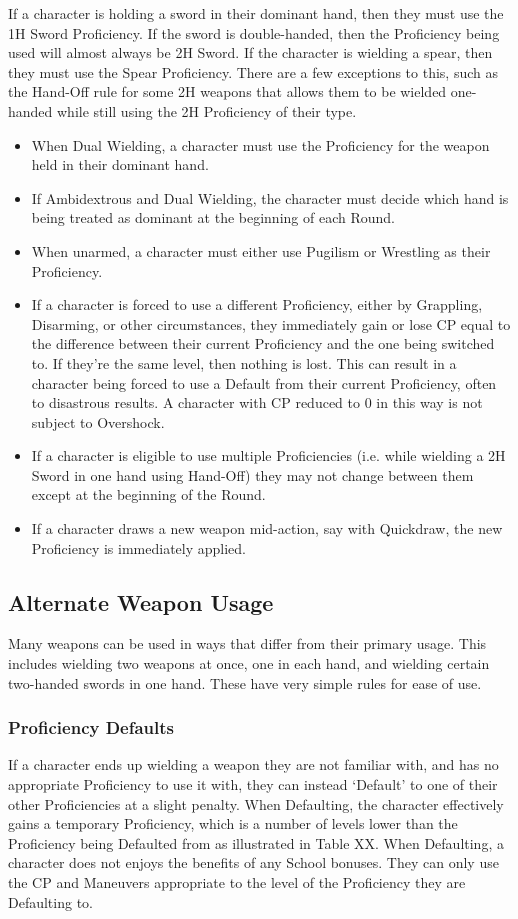\documentclass[oneside,11pt,english]{book}
\begin{document}
If a character is holding a sword in their dominant hand, then they must use the 1H Sword Proficiency. If 
the sword is double-handed, then the Proficiency being used will almost always be 2H Sword. If the 
character is wielding a spear, then they must use the Spear Proficiency. There are a few exceptions to this, 
such as the Hand-Off rule for some 2H weapons that allows them to be wielded one-handed while still 
using the 2H Proficiency of their type. 
\begin{itemize}
	\item When Dual Wielding, a character must use the Proficiency for the weapon held in their dominant hand. 
	\item If Ambidextrous and Dual Wielding, the character must decide which hand is being treated as dominant at the beginning of each Round.
	\item When unarmed, a character must either use Pugilism or Wrestling as their Proficiency. 
	\item If a character is forced to use a different Proficiency, either by Grappling, Disarming, or other circumstances, they immediately gain or lose CP equal to the difference between their current Proficiency and the one being switched to. If they’re the same level, then nothing is lost. This can result in a character being forced to use a Default from their current Proficiency, often to disastrous results. A character with CP reduced to 0 in this way is not subject to Overshock.
	\item If a character is eligible to use multiple Proficiencies (i.e. while wielding a 2H Sword in one hand using Hand-Off) they may not change between them except at the beginning of the Round.
	\item If a character draws a new weapon mid-action, say with Quickdraw, the new Proficiency is immediately applied.
\end{itemize}

\subsection{Alternate Weapon Usage}
Many weapons can be used in ways that differ from their primary usage. This includes wielding two 
weapons at once, one in each hand, and wielding certain two-handed swords in one hand. These have very 
simple rules for ease of use. 

\subsubsection{Proficiency Defaults}
If a character ends up wielding a weapon they are not familiar with, and has no appropriate Proficiency to 
use it with, they can instead ‘Default’ to one of their other Proficiencies at a slight penalty. When 
Defaulting, the character effectively gains a temporary Proficiency, which is a number of levels lower 
than the Proficiency being Defaulted from as illustrated in Table XX. When Defaulting, a character does 
not enjoys the benefits of any School bonuses. They can only use the CP and Maneuvers appropriate to 
the level of the Proficiency they are Defaulting to. 
\end{document}
